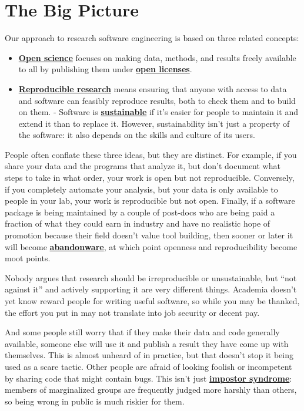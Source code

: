 \documentclass[
]{krantz}
\newcommand{\gref}[2]{\hyperlink{#2}{\textbf{#1}}}
\begin{document}
\hypertarget{intro-big-picture}{%
\section{The Big Picture}\label{intro-big-picture}}

Our approach to research software engineering is based on three related concepts:

\begin{itemize}
\item
  \gref{Open science}{open\_science} focuses on making data, methods, and results
  freely available to all by publishing them under \gref{open
  licenses}{open\_license}.
\item
  \gref{Reproducible research}{reproducible\_research} means ensuring that anyone
  with access to data and software can feasibly reproduce results, both to
  check them and to build on them. - Software is
  \gref{sustainable}{sustainable\_software} if it's easier for people to
  maintain it and extend it than to replace it. However, sustainability isn't
  just a property of the software: it also depends on the skills and culture
  of its users.
\end{itemize}

People often conflate these three ideas,
but they are distinct.
For example,
if you share your data and the programs that analyze it,
but don't document what steps to take in what order,
your work is open but not reproducible.
Conversely,
if you completely automate your analysis,
but your data is only available to people in your lab,
your work is reproducible but not open.
Finally,
if a software package is being maintained by a couple of post-docs
who are being paid a fraction of what they could earn in industry
and have no realistic hope of promotion because their field doesn't value tool building,
then sooner or later it will become \gref{abandonware}{abandonware},
at which point openness and reproducibility become moot points.

Nobody argues that research should be irreproducible or unsustainable,
but ``not against it'' and actively supporting it are very different things.
Academia doesn't yet know reward people for writing useful software,
so while you may be thanked,
the effort you put in may not translate into job security or decent pay.

And some people still worry that if they make their data and code generally available,
someone else will use it and publish a result they have come up with themselves.
This is almost unheard of in practice,
but that doesn't stop it being used as a scare tactic.
Other people are afraid of looking foolish or incompetent by sharing code that might contain bugs.
This isn't just \gref{impostor syndrome}{impostor\_syndrome}:
members of marginalized groups are frequently judged more harshly than others,
so being wrong in public is much riskier for them.
\end{document}
